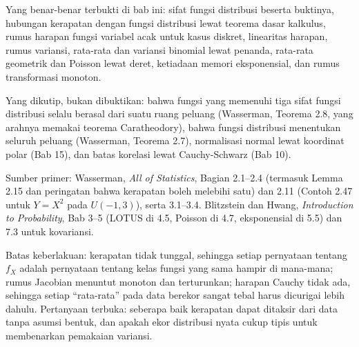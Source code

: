 \begin{untukpeneliti}
Yang benar-benar terbukti di bab ini: sifat fungsi distribusi beserta buktinya,
hubungan kerapatan dengan fungsi distribusi lewat teorema dasar kalkulus, rumus
harapan fungsi variabel acak untuk kasus diskret, linearitas harapan, rumus variansi,
rata-rata dan variansi binomial lewat penanda, rata-rata geometrik dan Poisson lewat
deret, ketiadaan memori eksponensial, dan rumus transformasi monoton.

Yang dikutip, bukan dibuktikan: bahwa fungsi yang memenuhi tiga sifat fungsi distribusi
selalu berasal dari suatu ruang peluang (Wasserman, Teorema 2.8, yang arahnya memakai
teorema Caratheodory), bahwa fungsi distribusi menentukan seluruh peluang (Wasserman,
Teorema 2.7), normalisasi normal lewat koordinat polar (Bab 15), dan batas korelasi
lewat Cauchy-Schwarz (Bab 10).

Sumber primer: Wasserman, \emph{All of Statistics}, Bagian 2.1--2.4 (termasuk Lemma
2.15 dan peringatan bahwa kerapatan boleh melebihi satu) dan 2.11 (Contoh 2.47 untuk
$Y=X^2$ pada $U(-1,3)$), serta 3.1--3.4. Blitzstein dan Hwang, \emph{Introduction to
Probability}, Bab 3--5 (LOTUS di 4.5, Poisson di 4.7, eksponensial di 5.5) dan 7.3
untuk kovariansi.

Batas keberlakuan: kerapatan tidak tunggal, sehingga setiap pernyataan tentang $f_X$
adalah pernyataan tentang kelas fungsi yang sama hampir di mana-mana; rumus Jacobian
menuntut monoton dan terturunkan; harapan Cauchy tidak ada, sehingga setiap
``rata-rata'' pada data berekor sangat tebal harus dicurigai lebih dahulu. Pertanyaan
terbuka: seberapa baik kerapatan dapat ditaksir dari data tanpa asumsi bentuk, dan
apakah ekor distribusi nyata cukup tipis untuk membenarkan pemakaian variansi.
\end{untukpeneliti}

